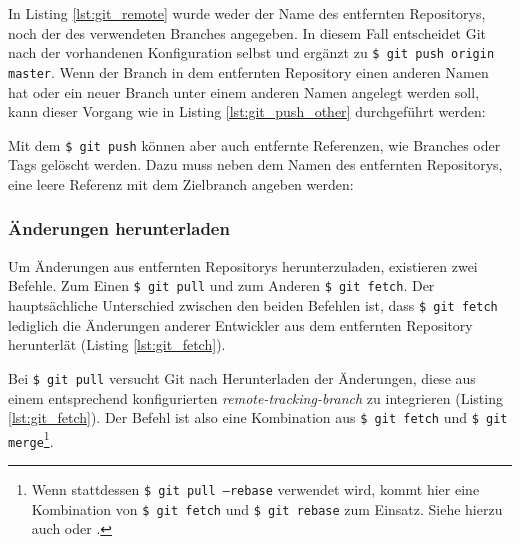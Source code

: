 
In Listing \ref{lst:git_remote} wurde weder der Name des entfernten Repositorys,
noch der des verwendeten Branches angegeben. In diesem Fall entscheidet Git
nach der vorhandenen Konfiguration selbst und ergänzt zu \texttt{\$ git
push origin master}. Wenn der Branch in dem entfernten Repository einen anderen
Namen hat oder ein neuer Branch unter einem anderen Namen angelegt werden soll,
kann dieser Vorgang wie in Listing \ref{lst:git_push_other} durchgeführt werden:


Mit dem \texttt{\$ git push} können aber auch entfernte Referenzen, wie
Branches oder Tags gelöscht werden. Dazu muss neben dem Namen des entfernten
Repositorys, eine leere Referenz mit dem Zielbranch angeben werden:
 \cite[S.~153-155]{gitosp}


\subsubsection{Änderungen herunterladen}
Um Änderungen aus entfernten Repositorys herunterzuladen, existieren zwei
Befehle. Zum Einen \texttt{\$ git pull} und zum Anderen \texttt{\$ git fetch}.
Der hauptsächliche Unterschied zwischen den beiden Befehlen ist, dass
\texttt{\$ git fetch} lediglich die Änderungen anderer Entwickler aus dem entfernten
Repository herunterlät (Listing \ref{lst:git_fetch}).


Bei \texttt{\$ git pull} versucht Git nach Herunterladen der
Änderungen, diese aus einem entsprechend konfigurierten
\textit{remote-tracking-branch} zu integrieren (Listing \ref{lst:git_fetch}).
Der Befehl ist also eine Kombination aus \texttt{\$ git fetch} und \texttt{\$
git merge}\footnote{Wenn stattdessen \texttt{\$ git pull --rebase} verwendet
wird, kommt hier eine Kombination von \texttt{\$ git fetch} und \texttt{\$ git
rebase} zum Einsatz. Siehe hierzu auch \cite[144-152]{gitosp} oder
\cite[85-88]{progit}.}. \cite[144-152]{gitosp}


